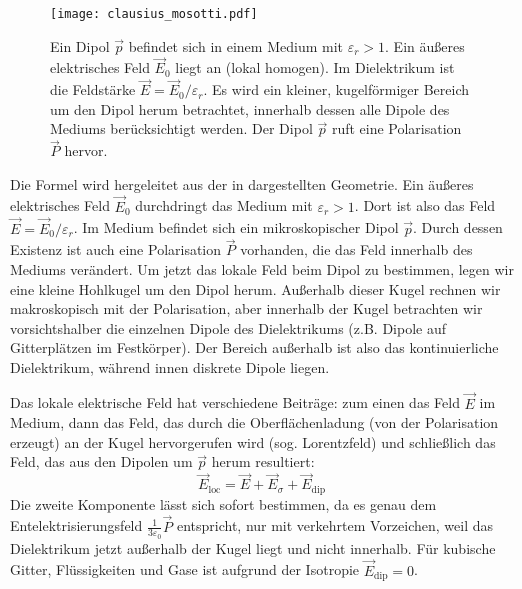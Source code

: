 \begin{figure}[htb]
	\centering
	\texttt{[image: clausius\_mosotti.pdf]}
	\caption{Ein Dipol $\vec p$ befindet sich in einem Medium mit $\varepsilon_r >1$. Ein äußeres elektrisches Feld $\vec E_0$ liegt an (lokal homogen). Im Dielektrikum ist die Feldstärke $\vec E=\vec E_0/\varepsilon_r$. Es wird ein kleiner, kugelförmiger Bereich um den Dipol herum betrachtet, innerhalb dessen alle Dipole des Mediums berücksichtigt werden. Der Dipol $\vec p$ ruft eine Polarisation $\vec P$ hervor. }
	\label{fig:clausius_mosotti}
\end{figure}

Die Formel wird hergeleitet aus der in  dargestellten Geometrie. Ein äußeres elektrisches Feld $\vec {E}_{0}$ durchdringt das Medium mit $\varepsilon _{r}>1$. Dort ist also das Feld $\vec {E}=\vec {E}_{0}/\varepsilon _{r}$. Im Medium befindet sich ein mikroskopischer Dipol $\vec {p}$. Durch dessen Existenz ist auch eine Polarisation $\vec {P}$ vorhanden, die das Feld innerhalb des Mediums verändert. Um jetzt das lokale Feld beim Dipol zu bestimmen, legen wir eine kleine Hohlkugel um den Dipol herum. Außerhalb dieser Kugel rechnen wir makroskopisch mit der Polarisation, aber innerhalb der Kugel betrachten wir vorsichtshalber die einzelnen Dipole des Dielektrikums (z.B. Dipole auf Gitterplätzen im Festkörper). Der Bereich außerhalb ist also das kontinuierliche Dielektrikum, während innen diskrete Dipole liegen.

Das lokale elektrische Feld hat verschiedene Beiträge: zum einen das Feld $\vec {E}$ im Medium, dann das Feld, das durch die Oberflächenladung (von der Polarisation erzeugt) an der Kugel hervorgerufen wird (sog. Lorentzfeld) und schließlich das Feld, das aus den Dipolen um $\vec {p}$ herum resultiert:
\begin{equation*}
	\vec {E}_{\mathrm{loc}}=\vec {E}+\vec {E}_{\sigma }+\vec {E}_{\mathrm{dip}}
\end{equation*}
Die zweite Komponente lässt sich sofort bestimmen, da es genau dem Entelektrisierungsfeld $\frac{1}{3\varepsilon _{0}}\vec {P}$ entspricht, nur mit verkehrtem Vorzeichen, weil das Dielektrikum jetzt außerhalb der Kugel liegt und nicht innerhalb. Für kubische Gitter, Flüssigkeiten und Gase ist aufgrund der Isotropie $\vec {E}_{\mathrm{dip}}=0$.

